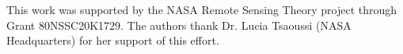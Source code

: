 \documentclass{ametsocV6.1}
\begin{document}




%


%

\clearpage
\acknowledgments
This work was supported by the NASA Remote Sensing Theory project through Grant 80NSSC20K1729. 
The authors thank Dr. Lucia Tsaoussi (NASA Headquarters) for her support of this effort.
\end{document}
